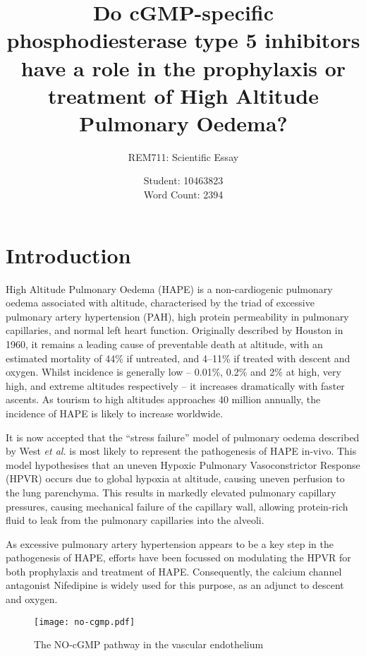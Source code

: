 \documentclass[12pt,a4paper]{article}
\title{Do cGMP-specific phosphodiesterase type 5 inhibitors have a role in the prophylaxis or treatment of High Altitude Pulmonary Oedema?}
\author{REM711: Scientific Essay}
\date{Student: 10463823 \\ Word Count: 2394}
\begin{document}
\maketitle


\section*{Introduction}

High Altitude Pulmonary Oedema (HAPE) is a non-cardiogenic pulmonary oedema associated with altitude, characterised by the triad of excessive pulmonary artery hypertension (PAH), high protein permeability in pulmonary capillaries, and normal left heart function.\cite{Fred:1962hy,Roy:1969tt,Schoene:1988tz} Originally described by Houston in 1960, it remains a leading cause of preventable death at altitude, with an estimated mortality of 44\% if untreated, and 4--11\% if treated with descent and oxygen.\cite{HOUSTON:1960gz,Lobenhoffer:1982eg,MENON:1965gk} Whilst incidence is generally low -- 0.01\%, 0.2\% and 2\% at high, very high, and extreme altitudes respectively -- it increases dramatically with faster ascents.\cite{Bartsch:2002cg} As tourism to high altitudes approaches 40 million annually, the incidence of HAPE is likely to increase worldwide.\cite{West:ug}

It is now accepted that the ``stress failure'' model of pulmonary oedema described by West \emph{et al.} is most likely to represent the pathogenesis of HAPE in-vivo.\cite{Maggiorini:2001vq} This model hypothesises that an uneven Hypoxic Pulmonary Vasoconstrictor Response (HPVR) occurs due to global hypoxia at altitude, causing uneven perfusion to the lung parenchyma. This results in markedly elevated pulmonary capillary pressures, causing mechanical failure of the capillary wall, allowing protein-rich fluid to leak from the pulmonary capillaries into the alveoli.\cite{West:1991vc,West:1995tg}

As excessive pulmonary artery hypertension appears to be a key step in the pathogenesis of HAPE,\cite{Maggiorini:2001vq,Swenson:2002ub} efforts have been focussed on modulating the HPVR for both prophylaxis and treatment of HAPE. Consequently, the calcium channel antagonist Nifedipine is widely used for this purpose, as an adjunct to descent and oxygen.\cite{Luks:2010ht}

\begin{figure}[!hb]
\centering
\texttt{[image: no-cgmp.pdf]}
\caption{The NO-cGMP pathway in the vascular endothelium\cite{Archer:2009cx}}
\label{fig:no-cgmp_pathway}
\end{figure}
\end{document}

